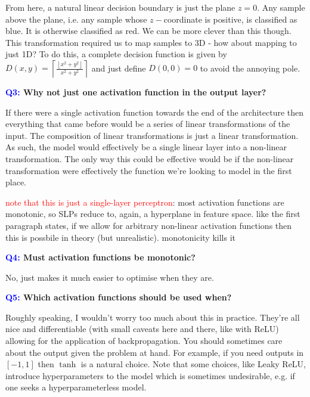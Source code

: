 \documentclass[11pt]{article}
\begin{document}
From here, a natural linear decision boundary is just the plane $z=0$. Any sample above the plane, i.e. any sample whose $z-$coordinate is positive, is classified as blue. It is otherwise classified as red. We can be more clever than this though. This transformation required us to map samples to 3D - how about mapping to just 1D? To do this, a complete decision function is given by $D(x,y)=\left\lceil\frac{\left\lfloor x^2+y^2\right\rfloor}{x^2+y^2}\right\rceil$ and just define $D(0,0)=0$ to avoid the annoying pole.

\begin{center}
    \textbf{\textcolor{blue}{Q3:} Why not just one activation function in the output layer?}
\end{center}
If there were a single activation function towards the end of the architecture then everything that came before would be a series of linear transformations of the input. The composition of linear transformations is just a linear transformation. As such, the model would effectively be a single linear layer into a non-linear transformation. The only way this could be effective would be if the non-linear transformation were effectively the function we're looking to model in the first place.

\textcolor{red}{note that this is just a single-layer perceptron}: most activation functions are monotonic, so SLPs reduce to, again, a hyperplane in feature space. like the first paragraph states, if we allow for arbitrary non-linear activation functions then this is possbile in theory (but unrealistic). monotonicity kills it

\begin{center}
    \textbf{\textcolor{blue}{Q4:} Must activation functions be monotonic?}
\end{center}
No, just makes it much easier to optimise when they are.

\begin{center}
    \textbf{\textcolor{blue}{Q5:} Which activation functions should be used when?}
\end{center}
Roughly speaking, I wouldn't worry too much about this in practice. They're all nice and differentiable (with small caveats here and there, like with ReLU) allowing for the application of backpropagation. You should sometimes care about the output given the problem at hand. For example, if you need outputs in $[-1,1]$ then $\tanh$ is a natural choice. Note that some choices, like Leaky ReLU, introduce hyperparameters to the model which is sometimes undesirable, e.g. if one seeks a hyperparameterless model.
\end{document}
